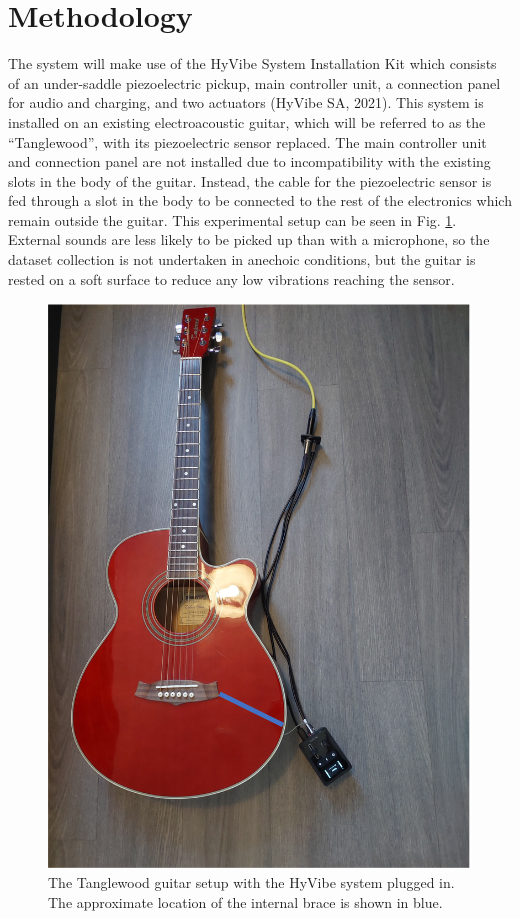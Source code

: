 \documentclass[conference]{IEEEtran}
\begin{document}
\section{Methodology}
The system will make use of the HyVibe System Installation Kit which consists of an under-saddle piezoelectric pickup, main controller unit, a connection panel for audio and charging, and two actuators (HyVibe SA, 2021).
This system is installed on an existing electroacoustic guitar, which will be referred to as the ``Tanglewood'', with its piezoelectric sensor replaced. The main controller unit and connection panel are not installed due to incompatibility with the existing slots in
the body of the guitar. Instead, the cable for the piezoelectric sensor is fed through a slot in the body to be connected to the rest of the electronics which remain outside the guitar. This experimental setup can be
seen in Fig. \ref{tanglewood-setup}. External sounds are less likely to be picked up than with a microphone, so the dataset collection is not undertaken in anechoic conditions, but the guitar is rested on a soft surface to reduce any low
vibrations reaching the sensor.

\begin{figure}[htbp]
    \centerline{\includegraphics[scale=0.4]{tanglewood-setup.png}}
    \caption{The Tanglewood guitar setup with the HyVibe system plugged in. The approximate location of the internal brace is shown in blue.}
    \label{tanglewood-setup}
    \end{figure}
\end{document}
